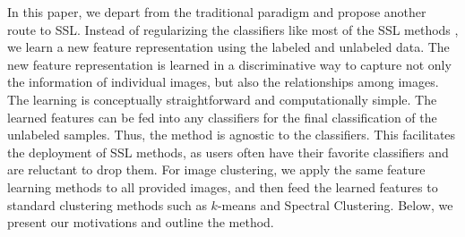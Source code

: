 


In this paper, we depart from the traditional paradigm and propose
another route to SSL. Instead of regularizing the
classifiers like most of the SSL methods \citep{SemiSVM, Joachims:1999,
  SemiBoost, SemiForest}, we learn a new feature representation 
using the labeled and unlabeled data. The new feature
representation is learned in a discriminative way to capture not only
the information of individual images, but also the relationships among
images. The learning is conceptually straightforward and
computationally simple. The learned features can be fed into any
classifiers for the final classification of the unlabeled samples.
Thus, the method is agnostic to the classifiers. This facilitates the
deployment of SSL methods, as users often have their favorite
classifiers and are reluctant to drop them. For image clustering, we
apply the same feature learning methods to all provided images, and
then feed the learned features to standard clustering methods such as
$k$-means and Spectral Clustering.  Below, we present our motivations
and outline the method.

